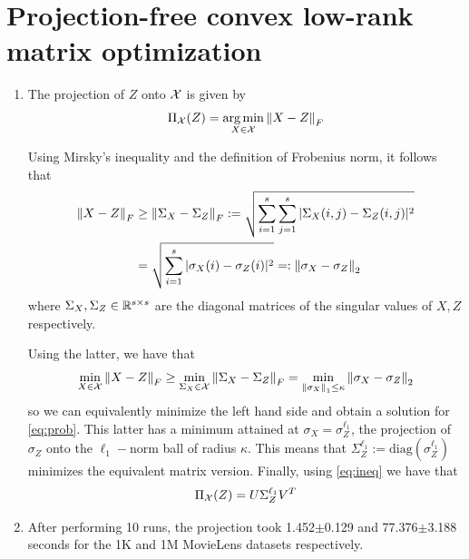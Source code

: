 \documentclass{article}
\begin{document}

\section{Projection-free convex low-rank matrix optimization}
\begin{enumerate}[label=(\alph*)]
    \item The projection of $Z$ onto $\mathcal{X}$ is given by
    \begin{align}
        \Pi_{\mathcal{X}}(Z)=\operatorname*{arg\,min}_{X\in \mathcal{X}}\left\lVert X-Z\right\rVert_F
        \label{eq:prob}
    \end{align}
    
    Using Mirsky's inequality and the definition of Frobenius norm, it follows that
    \begin{align}
        \left\lVert X-Z\right\rVert_F &\geq \left\lVert\Sigma_X - \Sigma_Z\right\rVert_F := \sqrt{\sum_{i=1}^s\sum_{j=1}^s |\Sigma_X(i,j) - \Sigma_Z(i,j)|^2}\\
        &=\sqrt{\sum_{i=1}^s|\sigma_X(i) - \sigma_Z(i)|^2}=:\left\lVert\sigma_X - \sigma_Z\right\rVert_2
    \end{align}
    where $\Sigma_X,\Sigma_Z\in \mathbb{R}^{s\times s}$ are the diagonal matrices of the singular values of $X,Z$ respectively.
    
    Using the latter, we have that
    \begin{align}
        \min_{X\in \mathcal{X}}\left\lVert X-Z\right\rVert_F \geq \min_{\Sigma_X\in \mathcal{X}}\left\lVert\Sigma_X - \Sigma_Z\right\rVert_F = \min_{\left\lVert\sigma_X\right\rVert_1 \leq \kappa}\left\lVert\sigma_X - \sigma_Z\right\rVert_2
        \label{eq:ineq}
    \end{align}
    so we can equivalently minimize the left hand side and obtain a solution for \eqref{eq:prob}. This latter has a minimum attained at $\sigma_X = \sigma_Z^{\ell_1}$, the projection of $\sigma_Z$ onto the $\ell_1-$norm ball of radius $\kappa$. This means that $\Sigma_Z^{\ell_1}:=\text{diag}(\sigma_Z^{\ell_1})$ minimizes the equivalent matrix version. Finally, using \eqref{eq:ineq} we have that
    \begin{align}
        \Pi_{\mathcal{X}}(Z)=U\Sigma_Z^{\ell_1} V^T
    \end{align}
    
    \item After performing 10 runs, the projection took 1.452$\pm$0.129 and 77.376$\pm$3.188 seconds for the 1K and 1M MovieLens datasets respectively.
\end{enumerate}
\end{document}
